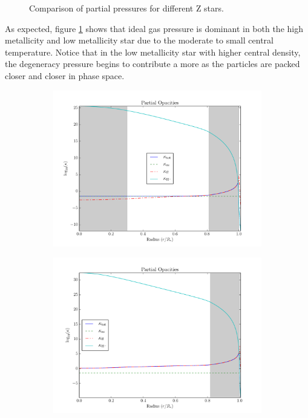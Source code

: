 \documentclass[11pt]{article}
\begin{document}
\begin{center}
\begin{figure}[H]
\begin{subfigure}{.5\textwidth}
            \end{subfigure}
            \caption{Comparison of partial pressures for different Z stars.}
            \label{fig:pressurecomparisonZ}
        \end{figure}
    \end{center}
    As expected, figure \ref{fig:pressurecomparisonZ} shows that ideal gas pressure is dominant in both the high metallicity and low metallicity star due to the moderate to small central temperature. Notice that in the low metallicity star with higher central density, the degeneracy pressure begins to contribute a more as the particles are packed closer and closer in phase space.
    \begin{center}
        \begin{figure}[H]
            \begin{subfigure}{.5\textwidth}
                \centering
                \includegraphics[width=1.1\textwidth]{figures/lowZ/partial_opacity.pdf}
            \end{subfigure}
            \begin{subfigure}{.5\textwidth}
                \centering
                \includegraphics[width=1.1\textwidth]{figures/highZ/partial_opacity.pdf}

\end{subfigure}
\end{figure}
\end{center}
\end{document}
